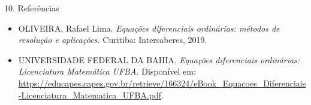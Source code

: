 \documentclass[11pt, aspectratio=169, xcolor=table]{beamer}
\begin{document}
\begin{frame}{10. Referências}
\small
\begin{itemize}
  \item OLIVEIRA, Rafael Lima. \textit{Equações diferenciais ordinárias: métodos de resolução e aplicações.} Curitiba: Intersaberes, 2019.
  \item UNIVERSIDADE FEDERAL DA BAHIA. \textit{Equações diferenciais ordinárias: Licenciatura Matemática UFBA.} Disponível em: \url{https://educapes.capes.gov.br/retrieve/166324/eBook_Equacoes_Diferenciais-Licenciatura_Matematica_UFBA.pdf}.
\end{itemize}
\end{frame}
\end{document}
